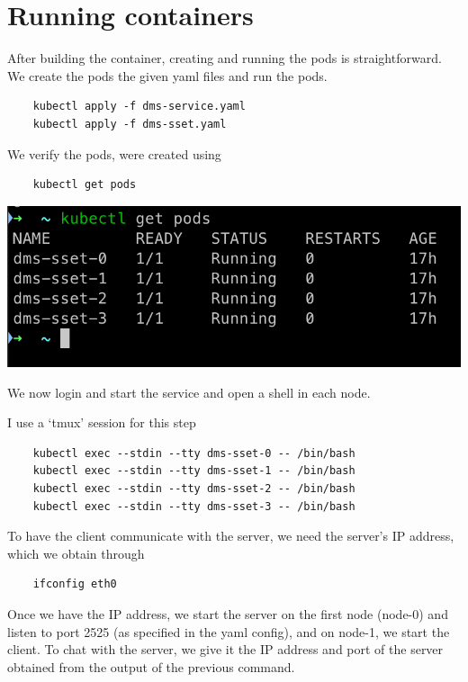 \documentclass{article}
\begin{document}
\section{Running containers}

After building the container, creating and running the pods is straightforward. We create the pods the given yaml files and run the pods.

\begin{lstlisting}
    kubectl apply -f dms-service.yaml
    kubectl apply -f dms-sset.yaml
\end{lstlisting}

We verify the pods, were created using

\begin{lstlisting}
    kubectl get pods
\end{lstlisting}

\begin{center}
    \includegraphics[scale=0.5]{pods.png}
\end{center}

We now login and start the service and open a shell in each node.

I use a `tmux' session for this step

\begin{lstlisting}
    kubectl exec --stdin --tty dms-sset-0 -- /bin/bash
    kubectl exec --stdin --tty dms-sset-1 -- /bin/bash
    kubectl exec --stdin --tty dms-sset-2 -- /bin/bash
    kubectl exec --stdin --tty dms-sset-3 -- /bin/bash
\end{lstlisting}

To have the client communicate with the server, we need the server's IP address, which we obtain through

\begin{lstlisting}
    ifconfig eth0
\end{lstlisting}

Once we have the IP address, we start the server on the first node (node-0) and listen to port 2525 (as specified in the yaml config), and on node-1, we start the client. To chat with the server, we give it the IP address and port of the server obtained from the output of the previous command.
\end{document}
